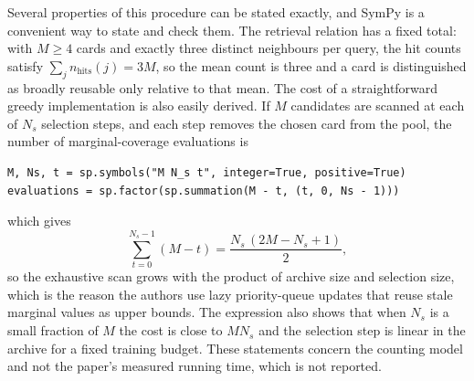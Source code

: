 \documentclass[11pt]{article}
\theoremstyle{remark}
\begin{document}
Several properties of this procedure can be stated exactly, and SymPy is a convenient way to state and check them. The retrieval relation has a fixed total: with $M \ge 4$ cards and exactly three distinct neighbours per query, the hit counts satisfy $\sum_j n_{\mathrm{hits}}(j) = 3M$, so the mean count is three and a card is distinguished as broadly reusable only relative to that mean. The cost of a straightforward greedy implementation is also easily derived. If $M$ candidates are scanned at each of $N_s$ selection steps, and each step removes the chosen card from the pool, the number of marginal-coverage evaluations is
\begin{verbatim}
M, Ns, t = sp.symbols("M N_s t", integer=True, positive=True)
evaluations = sp.factor(sp.summation(M - t, (t, 0, Ns - 1)))
\end{verbatim}
which gives
\begin{equation}
\sum_{t=0}^{N_s - 1}(M - t) = \frac{N_s\,(2M - N_s + 1)}{2},
\end{equation}
so the exhaustive scan grows with the product of archive size and selection size, which is the reason the authors use lazy priority-queue updates that reuse stale marginal values as upper bounds. The expression also shows that when $N_s$ is a small fraction of $M$ the cost is close to $MN_s$ and the selection step is linear in the archive for a fixed training budget. These statements concern the counting model and not the paper's measured running time, which is not reported.
\end{document}
